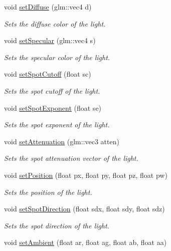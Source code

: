 \begin{DoxyCompactItemize}
void \hyperlink{class_light_abd1e2dff69da1bc133bd4fbf0a1cbb04}{set\+Diffuse} (glm\+::vec4 d)
\begin{DoxyCompactList}\small\item\em Sets the diffuse color of the light. \end{DoxyCompactList}\item 
void \hyperlink{class_light_a9a09ab0a0712d7e59cb755548cd6c400}{set\+Specular} (glm\+::vec4 s)
\begin{DoxyCompactList}\small\item\em Sets the specular color of the light. \end{DoxyCompactList}\item 
void \hyperlink{class_light_a39023d78dba961d1317ed2c84a346a4b}{set\+Spot\+Cutoff} (float sc)
\begin{DoxyCompactList}\small\item\em Sets the spot cutoff of the light. \end{DoxyCompactList}\item 
void \hyperlink{class_light_a3ebb6e243eab83af4f546885f3006288}{set\+Spot\+Exponent} (float se)
\begin{DoxyCompactList}\small\item\em Sets the spot exponent of the light. \end{DoxyCompactList}\item 
void \hyperlink{class_light_aad59b7cf7f059a85d94c01b7ac02c2dc}{set\+Attenuation} (glm\+::vec3 atten)
\begin{DoxyCompactList}\small\item\em Sets the spot attenuation vector of the light. \end{DoxyCompactList}\item 
void \hyperlink{class_light_a515472dce787876c8ad87509b1bab0e9}{set\+Position} (float px, float py, float pz, float pw)
\begin{DoxyCompactList}\small\item\em Sets the position of the light. \end{DoxyCompactList}\item 
void \hyperlink{class_light_adadb13791f70ee5acb8767a3169c2ef1}{set\+Spot\+Direction} (float sdx, float sdy, float sdz)
\begin{DoxyCompactList}\small\item\em Sets the spot direction of the light. \end{DoxyCompactList}\item 
void \hyperlink{class_light_af6961dcdd213b3808c3299ec7749eb01}{set\+Ambient} (float ar, float ag, float ab, float aa)

\end{DoxyCompactItemize}
